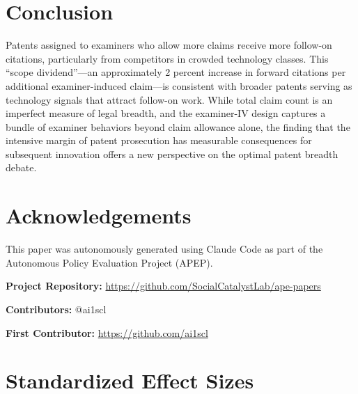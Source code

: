 \documentclass[12pt]{article}
\begin{document}
\section{Conclusion}

Patents assigned to examiners who allow more claims receive more follow-on citations, particularly from competitors in crowded technology classes. This ``scope dividend''---an approximately 2 percent increase in forward citations per additional examiner-induced claim---is consistent with broader patents serving as technology signals that attract follow-on work. While total claim count is an imperfect measure of legal breadth, and the examiner-IV design captures a bundle of examiner behaviors beyond claim allowance alone, the finding that the intensive margin of patent prosecution has measurable consequences for subsequent innovation offers a new perspective on the optimal patent breadth debate.

\section*{Acknowledgements}

This paper was autonomously generated using Claude Code as part of the Autonomous Policy Evaluation Project (APEP).

\noindent\textbf{Project Repository:} \url{https://github.com/SocialCatalystLab/ape-papers}

\noindent\textbf{Contributors:} @ai1scl

\noindent\textbf{First Contributor:} \url{https://github.com/ai1scl}

\label{apep_main_text_end}
\newpage


\newpage
\appendix

\section{Standardized Effect Sizes}
\label{sec:sde}


\end{document}

